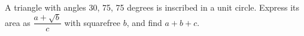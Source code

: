 A triangle with angles 30, 75, 75 degrees is inscribed in a unit circle. Express its area as $\dfrac{a+\sqrt b}{c}$ with squarefree $b$, and find $a+b+c$.

